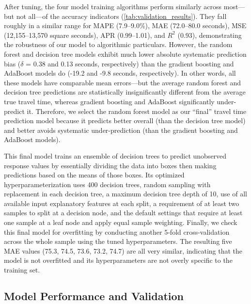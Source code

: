 \documentclass[12pt,letterpaper]{article} %
\begin{document}
After tuning, the four model training algorithms perform similarly across most---but not all---of the accuracy indicators (\autoref{tab:validation_results}). They fall roughly in a similar range for MAPE (7.9--9.0\%), MAE (72.0--80.0 seconds), MSE (12,155--13,570 square seconds), APR (0.99--1.01), and $R^2$ (0.93), demonstrating the robustness of our model to algorithmic particulars. However, the random forest and decision tree models exhibit much lower absolute systematic prediction bias ($\delta$ = 0.38 and 0.13 seconds, respectively) than the gradient boosting and AdaBoost models do (-19.2 and -9.8 seconds, respectively). In other words, all these models have comparable mean errors---but the average random forest and decision tree predictions are statistically insignificantly different from the average true travel time, whereas gradient boosting and AdaBoost significantly under-predict it. Therefore, we select the random forest model as our \enquote{final} travel time prediction model because it predicts better overall (than the decision tree model) and better avoids systematic under-prediction (than the gradient boosting and AdaBoost models).

This final model trains an ensemble of decision trees to predict unobserved response values by essentially dividing the data into boxes then making predictions based on the means of those boxes. Its optimized hyperparameterization uses 400 decision trees, random sampling with replacement in each decision tree, a maximum decision tree depth of 10, use of all available input explanatory features at each split, a requirement of at least two samples to split at a decision node, and the default settings that require at least one sample at a leaf node and apply equal sample weighting. Finally, we check this final model for overfitting by conducting another 5-fold cross-validation across the whole sample using the tuned hyperparameters. The resulting five MAE values (75.3, 74.5, 73.6, 73.2, 74.7) are all very similar, indicating that the model is not overfitted and its hyperparameters are not overly specific to the training set.

\subsection{Model Performance and Validation}
\end{document}
